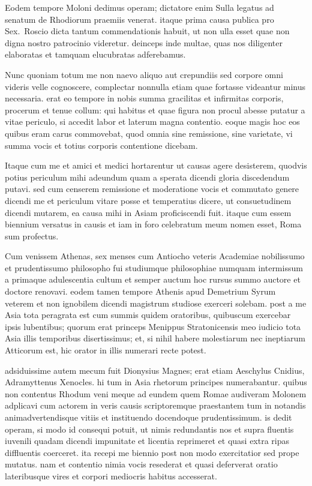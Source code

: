 Eodem tempore Moloni dedimus operam; dictatore enim Sulla legatus ad senatum de Rhodiorum praemiis venerat. itaque prima causa publica pro Sex.~Roscio dicta tantum commendationis habuit, ut non ulla esset quae non digna nostro patrocinio videretur. deinceps inde multae, quas nos diligenter elaboratas et tamquam elucubratas adferebamus.

Nunc quoniam totum me non naevo aliquo aut crepundiis sed corpore omni videris velle cognoscere, complectar nonnulla etiam quae fortasse videantur minus necessaria. erat eo tempore in nobis summa gracilitas et infirmitas corporis, procerum et tenue collum: qui habitus et quae figura non procul abesse putatur a vitae periculo, si accedit labor et laterum magna contentio. eoque magis hoc eos quibus eram carus commovebat, quod omnia sine remissione, sine varietate, vi summa vocis et totius corporis contentione dicebam.

Itaque cum me et amici et medici hortarentur ut causas agere desisterem, quodvis potius periculum mihi adeundum quam a sperata dicendi gloria discedendum putavi. sed cum censerem remissione et moderatione vocis et commutato genere dicendi me et periculum vitare posse et temperatius dicere, ut consuetudinem dicendi mutarem, ea causa mihi in Asiam proficiscendi fuit. itaque cum essem biennium versatus in causis et iam in foro celebratum meum nomen esset, Roma sum profectus.

Cum venissem Athenas, sex menses cum Antiocho veteris Academiae nobilissumo et prudentissumo philosopho fui studiumque philosophiae numquam intermissum a primaque adulescentia cultum et semper auctum hoc rursus summo auctore et doctore renovavi. eodem tamen tempore Athenis apud Demetrium Syrum veterem et non ignobilem dicendi magistrum studiose exerceri solebam. post a me Asia tota peragrata est cum summis quidem oratoribus, quibuscum exercebar ipsis lubentibus; quorum erat princeps Menippus Stratonicensis meo iudicio tota Asia illis temporibus disertissimus; et, si nihil habere molestiarum nec ineptiarum Atticorum est, hic orator in illis numerari recte potest.

adsiduissime autem mecum fuit Dionysius Magnes; erat etiam Aeschylus Cnidius, Adramyttenus Xenocles. hi tum in Asia rhetorum principes numerabantur. quibus non contentus Rhodum veni meque ad eundem quem Romae audiveram Molonem adplicavi cum actorem in veris causis scriptoremque praestantem tum in notandis animadvertendisque vitiis et instituendo docendoque prudentissimum. is dedit operam, si modo id consequi potuit, ut nimis redundantis nos et supra fluentis iuvenili quadam dicendi impunitate et licentia reprimeret et quasi extra ripas diffluentis coerceret. ita recepi me biennio post non modo exercitatior sed prope mutatus. nam et contentio nimia vocis resederat et quasi deferverat oratio lateribusque vires et corpori mediocris habitus accesserat.

